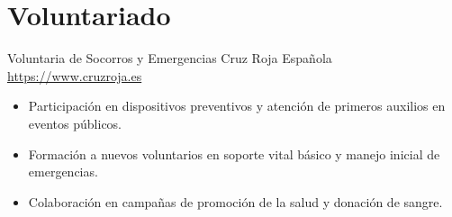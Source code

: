 \documentclass[a4paper, serif, 10pt]{moderncv}
\begin{document}
\section{Voluntariado}

        {Voluntaria de Socorros y Emergencias}
        {Cruz Roja Española}
        {\url{https://www.cruzroja.es}}
        {}
        {\begin{itemize}
\item Participación en dispositivos preventivos y atención de primeros auxilios en eventos públicos.
\item Formación a nuevos voluntarios en soporte vital básico y manejo inicial de emergencias.
\item Colaboración en campañas de promoción de la salud y donación de sangre.
\end{itemize}}
    
\end{document}
